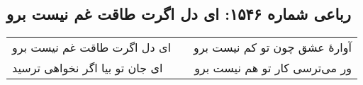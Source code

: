 \begin{center}
\section*{رباعی شماره ۱۵۴۶: ای دل اگرت طاقت غم نیست برو}
\label{sec:1546}
\begin{longtable}{l p{0.5cm} r}
ای دل اگرت طاقت غم نیست برو
&&
آوارهٔ عشق چون تو کم نیست برو
\\
ای جان تو بیا اگر نخواهی ترسید
&&
ور می‌ترسی کار تو هم نیست برو
\\
\end{longtable}
\end{center}
